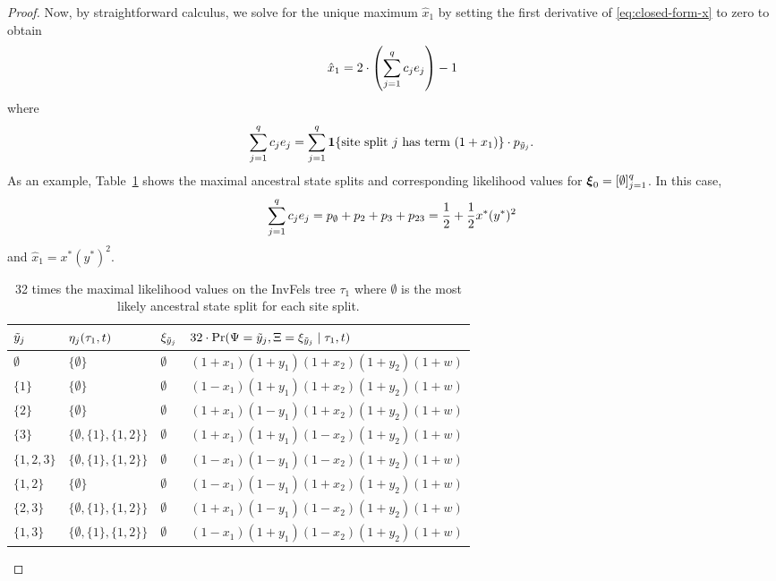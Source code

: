 \begin{proof}
Now, by straightforward calculus, we solve for the unique maximum $\hat{x}_1$ by setting the first derivative of \eqref{eq:closed-form-x} to zero to obtain
\[
\hat{x}_1 = 2\cdot\left(\sum_{j=1}^q c_je_j\right) - 1
\]
where
\[
\sum_{j=1}^q c_je_j = \sum_{j=1}^q \mathbf{1}\{\mbox{site split $j$ has term $(1+x_1)$}\} \cdot p_{\tilde{y}_j}.
\]
As an example, Table~\ref{tab:likelihoods-restricted} shows the maximal ancestral state splits and corresponding likelihood values for $\boldsymbol\xi_0 = [\emptyset]_{j=1}^q$.
In this case,
\[
\sum_{j=1}^q c_je_j = p_{\emptyset} + p_2 + p_3 + p_{23} = \frac{1}{2} + \frac{1}{2}x^*(y^*)^2
\]
and $\hat{x}_1 = x^*(y^*)^2$.

\begin{table}
\centering
\begin{tabular}{|lll|l|}
\hline
$\tilde{y}_j$ & $\eta_j(\tau_1, t)$ & $\xi_{\tilde{y}_j}$ & $32\cdot\Pr(\Psi=\tilde{y}_j,\Xi=\xi_{\tilde{y}_j} \mid \tau_1,t)$\\
\hline
$\emptyset$&$\{\emptyset\}$&$\emptyset$&$(1+x_1)(1+y_1)(1+x_2)(1+y_2)(1+w)$\\
$\{1\}$    &$\{\emptyset\}$&$\emptyset$&$(1-x_1)(1+y_1)(1+x_2)(1+y_2)(1+w)$\\
$\{2\}$    &$\{\emptyset\}$&$\emptyset$&$(1+x_1)(1-y_1)(1+x_2)(1+y_2)(1+w)$\\
$\{3\}$    &$\{\emptyset,\{1\},\{1,2\}\}$&$\emptyset$&$(1+x_1)(1+y_1)(1-x_2)(1+y_2)(1+w)$\\
$\{1,2,3\}$&$\{\emptyset,\{1\},\{1,2\}\}$&$\emptyset$&$(1-x_1)(1-y_1)(1-x_2)(1+y_2)(1+w)$\\
$\{1,2\}$  &$\{\emptyset\}$&$\emptyset$&$(1-x_1)(1-y_1)(1+x_2)(1+y_2)(1+w)$\\
$\{2,3\}$  &$\{\emptyset,\{1\},\{1,2\}\}$&$\emptyset$&$(1+x_1)(1-y_1)(1-x_2)(1+y_2)(1+w)$\\
$\{1,3\}$  &$\{\emptyset,\{1\},\{1,2\}\}$&$\emptyset$&$(1-x_1)(1+y_1)(1-x_2)(1+y_2)(1+w)$\\
\hline
\end{tabular}
\caption{
32 times the maximal likelihood values on the InvFels tree $\tau_1$ where $\emptyset$ is the most likely ancestral state split for each site split.
}
\label{tab:likelihoods-restricted}
\end{table}


\end{proof}
